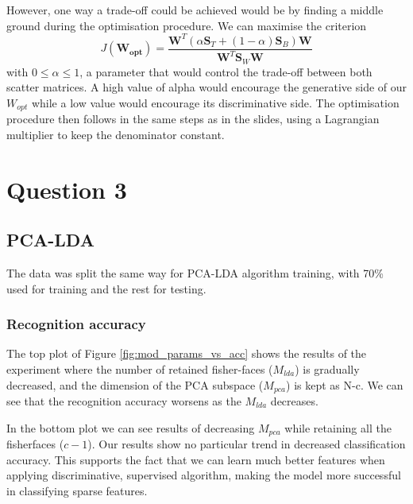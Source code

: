 \documentclass[10pt,technote]{IEEEtran}
\begin{document}
However, one way a trade-off could be achieved would be by finding a middle ground during the optimisation procedure. We can maximise the criterion 
\begin{equation}
    J(\boldsymbol{W_{opt}}) = \frac{\boldsymbol{W}^T(\alpha\boldsymbol{S}_T + (1 - \alpha)\boldsymbol{S}_B)\boldsymbol{W}}{\boldsymbol{W}^T\boldsymbol{S}_W\boldsymbol{W}}
\end{equation}
with $0 \le \alpha \le 1$, a parameter that would control the trade-off between both scatter matrices. A high value of alpha would encourage the generative side of our $W_{opt}$ while a low value would encourage its discriminative side. 
The optimisation procedure then follows in the same steps as in the slides, using a Lagrangian multiplier to keep the denominator constant.


\section{Question 3}
\subsection{PCA-LDA}
The data was split the same way for PCA-LDA algorithm training, with 70\% used for training and the rest for testing. 

\subsubsection{Recognition accuracy}
The top plot of Figure \ref{fig:mod_params_vs_acc} shows the results of  the experiment where the number of retained fisher-faces ($M_{lda}$) is gradually decreased, and the dimension of the PCA subspace ($M_{pca}$) is kept as N-c. We can see that the recognition accuracy worsens as the $M_{lda}$ decreases.

In the bottom plot we can see results of decreasing $M_{pca}$ while retaining all the fisherfaces ($c-1$). Our results show no particular trend in decreased classification accuracy. This supports the fact that we can learn much better features when applying discriminative, supervised algorithm, making the model more successful in classifying sparse features.
\end{document}
